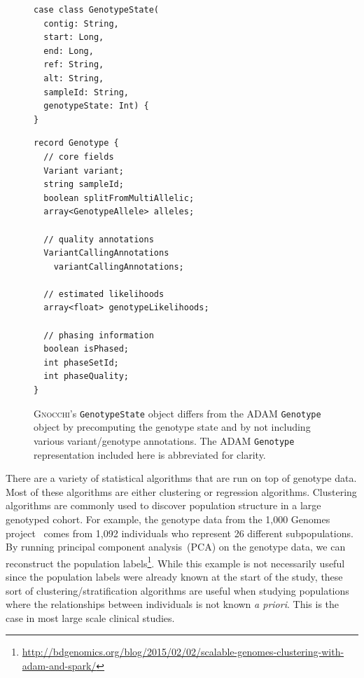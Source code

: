 \documentclass[11pt]{article} %
\begin{document}
\begin{centering}
\begin{figure}
\begin{minipage}{0.45\linewidth}
\begin{lstlisting}[frame=none]
case class GenotypeState(
  contig: String,
  start: Long,
  end: Long,
  ref: String,
  alt: String,
  sampleId: String,
  genotypeState: Int) {
}
\end{lstlisting}
\end{minipage}
\begin{minipage}{0.45\linewidth}
\begin{verbatim}
record Genotype {
  // core fields
  Variant variant;
  string sampleId;
  boolean splitFromMultiAllelic;
  array<GenotypeAllele> alleles;

  // quality annotations
  VariantCallingAnnotations
    variantCallingAnnotations;

  // estimated likelihoods
  array<float> genotypeLikelihoods;

  // phasing information
  boolean isPhased;
  int phaseSetId;
  int phaseQuality;
}
\end{verbatim}
\end{minipage}
\caption{\textsc{Gnocchi}'s \texttt{GenotypeState} object differs from the
\textsc{ADAM} \texttt{Genotype} object by precomputing the genotype state and by
not including various variant/genotype annotations. The \textsc{ADAM}
\texttt{Genotype} representation included here is abbreviated for clarity.}
\label{fig:genotype-state}
\end{figure}
\end{centering}

There are a variety of statistical algorithms that are run on top of genotype
data. Most of these algorithms are either clustering or regression algorithms.
Clustering algorithms are commonly used to discover population structure in a
large genotyped cohort. For example, the genotype data from the 1,000 Genomes
project~\cite{1kg} comes from 1,092 individuals who represent 26 different
subpopulations. By running principal component analysis~(PCA) on the genotype
data, we can reconstruct the population labels\footnote{\url{http://bdgenomics.org/blog/2015/02/02/scalable-genomes-clustering-with-adam-and-spark/}}.
While this example is not necessarily useful since the population labels were
already known at the start of the study, these sort of clustering/stratification
algorithms are useful when studying populations where the relationships between
individuals is not known \emph{a priori}. This is the case in most large scale
clinical studies.
\end{document}
